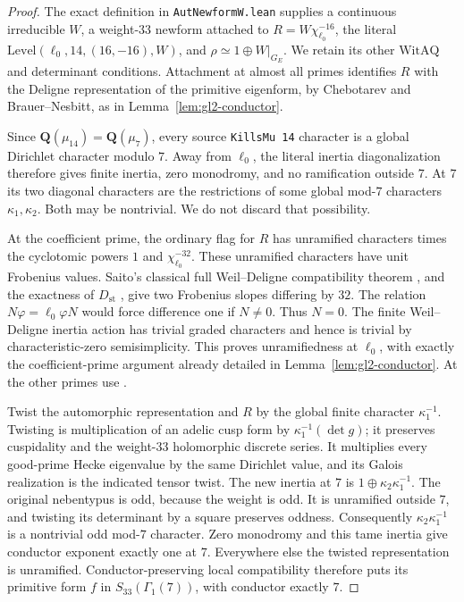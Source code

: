 \begin{proof}
The exact definition in \texttt{AutNewformW.lean} supplies a
continuous irreducible \(W\), a weight-\(33\) newform attached to
\(R=W\chi_{\ell_0}^{-16}\), the literal
\(\mathrm{Level}(\ell_0,14,(16,-16),W)\), and
\(\rho\simeq1\oplus W|_{G_E}\). We retain its other
\(\mathrm{WitAQ}\) and determinant conditions.
Attachment at almost all primes identifies \(R\) with the
Deligne representation of the primitive eigenform, by
Chebotarev and Brauer--Nesbitt, as in
Lemma~\ref{lem:gl2-conductor}.

Since \(\mathbf Q(\mu_{14})=\mathbf Q(\mu_7)\), every source
\texttt{KillsMu 14} character is a global Dirichlet character
modulo \(7\). Away from \(\ell_0\), the literal inertia
diagonalization therefore gives finite inertia, zero monodromy,
and no ramification outside \(7\). At \(7\) its two diagonal
characters are the restrictions of some global mod-\(7\)
characters \(\kappa_1,\kappa_2\). Both may be nontrivial.
We do not discard that possibility.

At the coefficient prime, the ordinary flag for \(R\) has
unramified characters times the cyclotomic powers \(1\) and
\(\chi_{\ell_0}^{-32}\). These unramified characters have unit
Frobenius values. Saito's classical full Weil--Deligne
compatibility theorem
\cite[\S2c, Theorem~3, p.~9]{K17SaitoSurvey}, and the exactness
of \(D_{\mathrm{st}}\)
\cite[\S4.1, Proposition~4.2, p.~23]{K17ColmezFontaine2000},
give two Frobenius slopes differing by \(32\).
The relation \(N\varphi=\ell_0\varphi N\) would force difference
one if \(N\ne0\). Thus \(N=0\). The finite Weil--Deligne
inertia action has trivial graded characters and hence is
trivial by characteristic-zero semisimplicity. This proves
unramifiedness at \(\ell_0\), with exactly the coefficient-prime
argument already detailed in Lemma~\ref{lem:gl2-conductor}.
At the other primes use
\cite[\S0.7, Theorem~A, pp.~410--411]{K17Carayol1986}.

Twist the automorphic representation and \(R\) by the global
finite character \(\kappa_1^{-1}\). Twisting is multiplication
of an adelic cusp form by \(\kappa_1^{-1}(\det g)\); it preserves
cuspidality and the weight-\(33\) holomorphic discrete series.
It multiplies every good-prime Hecke eigenvalue by the same
Dirichlet value, and its Galois realization is the indicated
tensor twist. The new inertia at \(7\) is
\(1\oplus\kappa_2\kappa_1^{-1}\).
The original nebentypus is odd, because the weight is odd.
It is unramified outside \(7\), and twisting its determinant
by a square preserves oddness. Consequently
\(\kappa_2\kappa_1^{-1}\) is a nontrivial odd mod-\(7\)
character. Zero monodromy and this tame inertia give conductor
exponent exactly one at \(7\). Everywhere else the twisted
representation is unramified. Conductor-preserving local
compatibility therefore puts its primitive form \(f\) in
\(S_{33}(\Gamma_1(7))\), with conductor exactly \(7\).


\end{proof}
